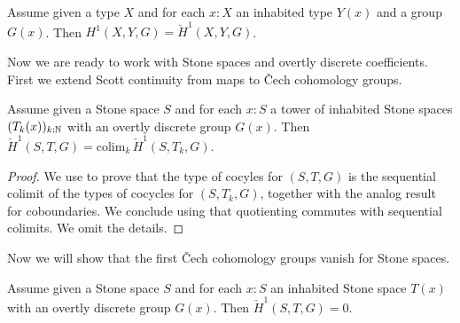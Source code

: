 \begin{proposition}
Assume given a type $X$ and for each $x:X$ an inhabited type $Y(x)$ and a group $G(x)$. Then $H^1(X,Y,G)=\check{H}^1(X,Y,G)$.
\end{proposition}

Now we are ready to work with Stone spaces and overtly discrete coefficients. First we extend Scott continuity from maps to \v{C}ech cohomology groups.


\begin{lemma}\label{first-cech-scott-continuity}
Assume given a Stone space $S$ and for each $x:S$ a tower of inhabited Stone spaces $(T_k(x))_{k:\mathbb{N}}$ with an overtly discrete group $G(x)$. %
Then $\check{H}^1(S,T,G) = \mathrm{colim}_k\, \check{H}^1(S,T_k,G)$.
\end{lemma}

\begin{proof}
We use  to prove that the type of cocyles for $(S,T,G)$ is the sequential colimit of the types of cocycles for $(S,T_k,G)$, together with the analog result for coboundaries. We conclude using that quotienting commutes with sequential colimits. We omit the details.
\end{proof}


Now we will show that the first \v Cech cohomology groups vanish for Stone spaces.

\begin{lemma}\label{cech-vanishing-first-stone}
Assume given a Stone space $S$ and for each $x:S$ an inhabited Stone space $T(x)$ with an overtly discrete group $G(x)$. Then $\check{H}^1(S,T,G) = 0$.
\end{lemma}

